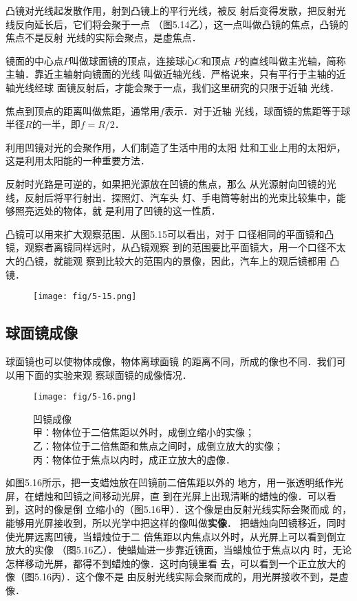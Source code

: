 凸镜对光线起发散作用，射到凸镜上的平行光线，被反
射后变得发散，把反射光线反向延长后，它们将会聚于一点
（图5.14乙），这一点叫做凸镜的焦点，凸镜的焦点不是反射
光线的实际会聚点，是虚焦点．

镜面的中心点$P$叫做球面镜的顶点，连接球心$C$和顶点
$P$的直线叫做主光轴，简称主轴．靠近主轴射向镜面的光线
叫做近轴光线．严格说来，只有平行于主轴的近轴光线经球
面镜反射后，才能会聚于一点，我们这里研究的只限于近轴
光线．

焦点到顶点的距离叫做焦距，通常用$f$表示．对于近轴
光线，球面镜的焦距等于球半径$R$的一半，即$f=R/2$．

利用凹镜对光的会聚作用，人们制造了生活中用的太阳
灶和工业上用的太阳炉，这是利用太阳能的一种重要方法．

反射时光路是可逆的，如果把光源放在凹镜的焦点，那么
从光源射向凹镜的光线，反射后将平行射出．探照灯、汽车头
灯、手电筒等射出的光束比较集中，能够照亮远处的物体，就
是利用了凹镜的这一性质．

凸镜可以用来扩大观察范围．从图5.15可以看出，对于
口径相同的平面镜和凸镜，观察者离镜同样远时，从凸镜观察
到的范围要比平面镜大，用一个口径不太大的凸镜，就能观
察到比较大的范围内的景像，因此，汽车上的观后镜都用
凸镜．

\begin{figure}[htp]\centering
    \texttt{[image: fig/5-15.png]}
    \caption{}
    \end{figure}

\subsection{球面镜成像}
球面镜也可以使物体成像，物体离球面镜
的距离不同，所成的像也不同．我们可以用下面的实验来观
察球面镜的成像情况．
\begin{figure}[htp]\centering
    \texttt{[image: fig/5-16.png]}
    \caption{凹镜成像\\
    甲：物体位于二倍焦距以外时，成倒立缩小的实像；\\
    乙：物体位于二倍焦距和焦点之间时，成倒立放大的实像；\\
    丙：物体位于焦点以内时，成正立放大的虚像．}
    \end{figure}

如图5.16所示，把一支蜡烛放在凹镜前二倍焦距以外的
地方，用一张透明纸作光屏，在蜡烛和凹镜之间移动光屏，直
到在光屏上出现清晰的蜡烛的像．可以看到，这时的像是倒
立缩小的（图5.16甲）．这个像是由反射光线实际会聚而成
的，能够用光屏接收到，所以光学中把这样的像叫做\textbf{实像}．
把蜡烛向凹镜移近，同时使光屏远离凹镜，当蜡烛位于二
倍焦距以内焦点以外时，从光屏上可以看到倒立放大的实像
（图5.16乙）．使蜡灿进一步靠近镜面，当蜡烛位于焦点以内
时，无论怎样移动光屏，都得不到蜡烛的像．这时向镜里看
去，可以看到一个正立放大的像（图5.16丙）．这个像不是
由反射光线实际会聚而成的，用光屏接收不到，是虚像．

